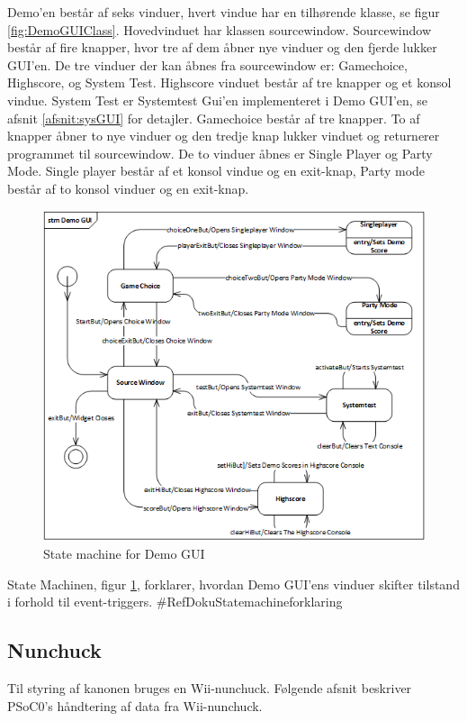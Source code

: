 Demo'en består af seks vinduer, hvert vindue har en tilhørende klasse, se figur \ref{fig:DemoGUIClass}.
Hovedvinduet har klassen sourcewindow. Sourcewindow består af fire knapper,
hvor tre af dem åbner nye vinduer og den fjerde lukker GUI'en.
De tre vinduer der kan åbnes fra sourcewindow er: Gamechoice, Highscore, og System Test.
Highscore vinduet består af tre knapper og et konsol vindue. System Test er Systemtest Gui'en
implementeret i Demo GUI'en, se afsnit \ref{afsnit:sysGUI} for detajler.
Gamechoice består af tre knapper. To af knapper åbner to nye vinduer og den tredje knap lukker vinduet
og returnerer programmet til sourcewindow. De to vinduer åbnes er Single Player og Party Mode.
Single player består af et konsol vindue og en exit-knap, Party mode består af to konsol vinduer og en exit-knap.


\begin{figure}[H]
	\centering
	\includegraphics[width=1.2\textwidth]{Afsnit/DesignOgImplementering/images/StateMachineDemoGUI}
	\caption{State machine for Demo GUI}
	\label{fig:StateMachineDemo}
\end{figure}

State Machinen, figur \ref{fig:StateMachineDemo}, forklarer, hvordan Demo GUI'ens vinduer skifter tilstand i forhold til event-triggers.
\#RefDokuStatemachineforklaring

\subsection{Nunchuck}
Til styring af kanonen bruges en Wii-nunchuck. Følgende afsnit beskriver PSoC0's håndtering af data fra Wii-nunchuck.

